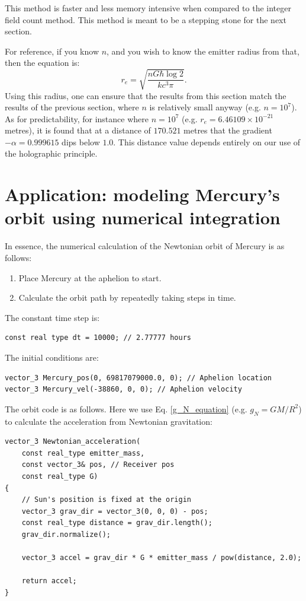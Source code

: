 \documentclass[12pt]{article}
\begin{document}
This method is faster and less memory intensive when compared to the integer field count method.
This method is meant to be a stepping stone for the next section.

For reference, if you know $n$, and you wish to know the emitter radius from that, then the equation is:
\begin{equation}
r_{\textit{e}} = \sqrt{\frac{n G \hbar \log 2}{k c^3 \pi}}.
\end{equation}
Using this radius, one can ensure that the results from this section match the results of the previous section, where $n$ is relatively small anyway (e.g. $n = 10^7$).
As for predictability, for instance where $n = 10^7$ (e.g. $r_{\textit{e}} = 6.46109 \times 10^{-21}$ metres), it is found that at a distance of $170.521$ metres that the gradient $-\alpha = 0.999615$ dips below $1.0$.
This distance value depends entirely on our use of the holographic principle.




\section{Application: modeling Mercury's orbit using numerical integration}

In essence, the numerical calculation of the Newtonian orbit of Mercury is as follows:
\begin{enumerate}
\item Place Mercury at the aphelion to start.
\item Calculate the orbit path by repeatedly taking steps in time.
\end{enumerate}

The constant time step \cite{fiedler1} is:
\begin{lstlisting}
const real type dt = 10000; // 2.77777 hours
\end{lstlisting}

The initial conditions are:
\begin{lstlisting}
vector_3 Mercury_pos(0, 69817079000.0, 0); // Aphelion location
vector_3 Mercury_vel(-38860, 0, 0); // Aphelion velocity
\end{lstlisting}

The orbit code is as follows. 
Here we use Eq. \ref{g_N_equation} (e.g. $g_N = {G M}/{R^2}$) to calculate the acceleration from Newtonian gravitation:
\begin{lstlisting}
vector_3 Newtonian_acceleration(
	const real_type emitter_mass,
	const vector_3& pos, // Receiver pos
	const real_type G)
{
	// Sun's position is fixed at the origin
	vector_3 grav_dir = vector_3(0, 0, 0) - pos;
	const real_type distance = grav_dir.length();
	grav_dir.normalize();

	vector_3 accel = grav_dir * G * emitter_mass / pow(distance, 2.0);

	return accel;
}
\end{lstlisting}
\end{document}
